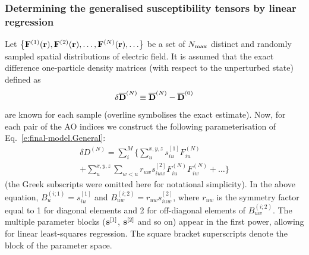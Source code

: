 \documentclass[aip,amsmath,amssymb,reprint,floatfix]{revtex4-1}
\begin{document}
\subsubsection{Determining the generalised susceptibility tensors by linear regression}

Let $\left\{ {\bf F}^{(1)}({\bf r}), {\bf F}^{(2)}({\bf r}), \ldots, {\bf F}^{(N)}({\bf r}), \ldots \right\}$ 
be a set of $N_{\rm max}$ distinct and randomly sampled 
spatial distributions of electric field. It is assumed that
the exact difference one\hyp{}particle density matrices (with respect to the unperturbed state)
defined as
%
\begin{equation}
 \delta \overline{\bf D}^{(N)} \equiv \overline{\bf D}^{(N)} - \overline{\bf D}^{(0)}
\end{equation}
%
are known for each sample (overline symbolises the exact estimate).
Now, for each pair of the AO indices we construct the following 
parameterisation of Eq.~\eqref{e:final-model.General}:
%
\begin{multline}\label{e:final-model.General.Parameters}
 \delta D^{(N)} = \sum_{i }^M \Big\{ 
                              \sum_u^{x,y,z} s^{[1]}_{iu} F_{iu}^{(N)} \\
                +             \sum_{u}^{x,y,z} \sum_{w<u} r_{uw} s^{[2]}_{iuw} F_{iu}^{(N)} F_{iw}^{(N)} 
                        + \ldots \Big\}
\end{multline}
%
(the Greek subscripts were omitted here for notational simplicity).
In the above equation, $B_u^{(i;1)} = s^{[1]}_{iu}$ and $B_{uw}^{(i;2)} = r_{uw} s^{[2]}_{iuw}$,
where $r_{uw}$ is the symmetry factor equal to 1 for diagonal elements and 2 for off\hyp{}diagonal
elements of $B_{uw}^{(i;2)}$.
The multiple parameter blocks
(${\bf s}^{[1]}$, ${\bf s}^{[2]}$ and so on)
appear in the first power, allowing for linear least\hyp{}squares regression.
The square bracket superscripts denote the block of the parameter space. 
\end{document}
